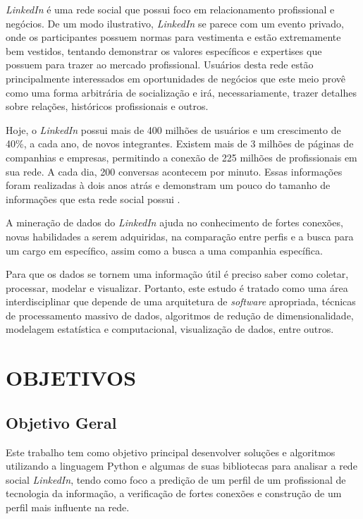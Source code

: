 \textit{LinkedIn} é uma rede social que possui foco em relacionamento profissional e negócios. De um modo ilustrativo, \textit{LinkedIn} se parece com um evento privado, onde os participantes possuem normas para vestimenta e estão extremamente bem vestidos, tentando demonstrar os valores específicos e expertises que possuem para trazer ao mercado profissional. Usuários desta rede estão principalmente interessados em oportunidades de negócios que este meio provê como uma forma arbitrária de socialização e irá, necessariamente, trazer detalhes sobre relações, históricos profissionais e outros.

Hoje, o \textit{LinkedIn} possui mais de 400 milhões de usuários e um crescimento de 40\%, a cada ano, de novos integrantes. Existem mais de 3 milhões de páginas de companhias e empresas, permitindo a conexão de 225 milhões de profissionais em sua rede. A cada dia, 200 conversas acontecem por minuto. Essas informações foram realizadas à dois anos atrás e demonstram um pouco do tamanho de informações que esta rede social possui \cite{linkedin-about}.

A mineração de dados do \textit{LinkedIn} ajuda no conhecimento de fortes conexões, novas habilidades a serem adquiridas, na comparação entre perfis e a busca para um cargo em específico, assim como a busca a uma companhia específica.

Para que os dados se tornem uma informação útil é preciso saber como coletar, processar, modelar e visualizar. Portanto, este estudo é tratado como uma área interdisciplinar que depende de uma arquitetura de \textit{software} apropriada, técnicas de processamento massivo de dados, algoritmos de redução de dimensionalidade, modelagem estatística e computacional, visualização de dados, entre outros.


\section{OBJETIVOS}\label{sec:objetivos}

\subsection{Objetivo Geral}

Este trabalho tem como objetivo principal desenvolver soluções e algoritmos utilizando a linguagem Python e algumas de suas bibliotecas para analisar a rede social \textit{LinkedIn}, tendo como foco a predição de um perfil de um profissional de tecnologia da informação, a verificação de fortes conexões e construção de um perfil mais influente na rede.

